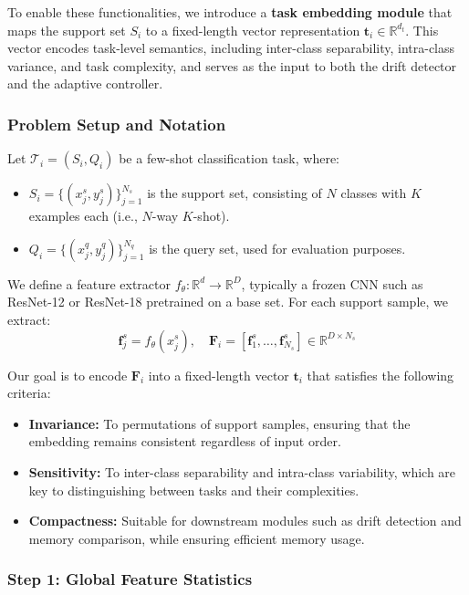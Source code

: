 \documentclass[conference]{IEEEtran}
\begin{document}
To enable these functionalities, we introduce a \textbf{task embedding module} that maps the support set $S_i$ to a fixed-length vector representation $\mathbf{t}_i \in \mathbb{R}^{d_t}$. This vector encodes task-level semantics, including inter-class separability, intra-class variance, and task complexity, and serves as the input to both the drift detector and the adaptive controller.

\subsubsection*{Problem Setup and Notation}

Let $\mathcal{T}_i = (S_i, Q_i)$ be a few-shot classification task, where:
\begin{itemize}
    \item $S_i = \{(x_j^s, y_j^s)\}_{j=1}^{N_s}$ is the support set, consisting of $N$ classes with $K$ examples each (i.e., $N$-way $K$-shot).
    \item $Q_i = \{(x_j^q, y_j^q)\}_{j=1}^{N_q}$ is the query set, used for evaluation purposes.
\end{itemize}

We define a feature extractor $f_\theta : \mathbb{R}^d \rightarrow \mathbb{R}^D$, typically a frozen CNN such as ResNet-12 or ResNet-18 pretrained on a base set. For each support sample, we extract:
\[
\mathbf{f}_j^s = f_\theta(x_j^s), \quad \mathbf{F}_i = [\mathbf{f}_1^s, \ldots, \mathbf{f}_{N_s}^s] \in \mathbb{R}^{D \times N_s}
\]

Our goal is to encode $\mathbf{F}_i$ into a fixed-length vector $\mathbf{t}_i$ that satisfies the following criteria:
\begin{itemize}
    \item \textbf{Invariance:} To permutations of support samples, ensuring that the embedding remains consistent regardless of input order.
    \item \textbf{Sensitivity:} To inter-class separability and intra-class variability, which are key to distinguishing between tasks and their complexities.
    \item \textbf{Compactness:} Suitable for downstream modules such as drift detection and memory comparison, while ensuring efficient memory usage.
\end{itemize}

\subsubsection*{Step 1: Global Feature Statistics}
\end{document}
